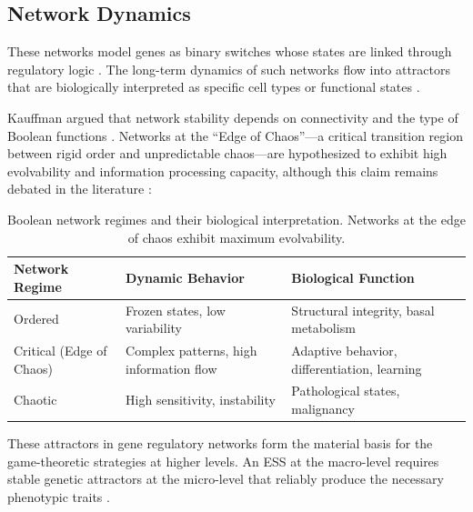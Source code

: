 \documentclass[12pt,a4paper]{article}
\theoremstyle{remark}
\begin{document}
\subsection{Network Dynamics}

These networks model genes as binary switches whose states are linked through regulatory logic \citep{BooleanPost}. The long-term dynamics of such networks flow into attractors that are biologically interpreted as specific cell types or functional states \citep{BooleanEvolution}.

Kauffman argued that network stability depends on connectivity and the type of Boolean functions \citep{BooleanPost}. Networks at the ``Edge of Chaos''---a critical transition region between rigid order and unpredictable chaos---are hypothesized to exhibit high evolvability and information processing capacity, although this claim remains debated in the literature \citep{KauffmanOrigins}:

\begin{table}[htbp]
\centering
\caption{Boolean network regimes and their biological interpretation. Networks at the edge of chaos exhibit maximum evolvability.}
\label{tab:network-regimes}
\begin{tabular}{lll}
\toprule
\textbf{Network Regime} & \textbf{Dynamic Behavior} & \textbf{Biological Function} \\
\midrule
Ordered & Frozen states, low variability & Structural integrity, basal metabolism \\
Critical (Edge of Chaos) & Complex patterns, high information flow & Adaptive behavior, differentiation, learning \\
Chaotic & High sensitivity, instability & Pathological states, malignancy \\
\bottomrule
\end{tabular}
\end{table}

These attractors in gene regulatory networks form the material basis for the game-theoretic strategies at higher levels. An ESS at the macro-level requires stable genetic attractors at the micro-level that reliably produce the necessary phenotypic traits \citep{BooleanMicroarray,KauffmanOrigins}.
\end{document}
